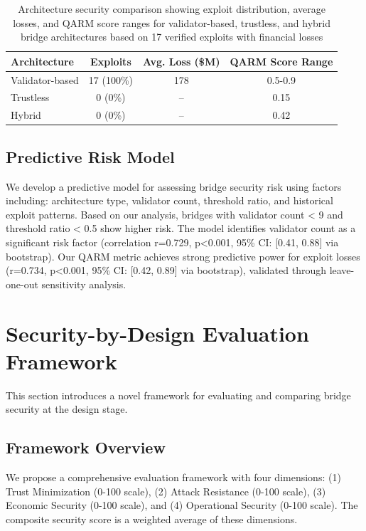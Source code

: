 \documentclass[runningheads]{llncs}
\begin{document}
\begin{table}[!ht]
    \centering
    \caption{Architecture security comparison showing exploit distribution, average losses, and QARM score ranges for validator-based, trustless, and hybrid bridge architectures based on 17 verified exploits with financial losses}
    \label{tab:architecture_security}
    \begin{tabular}{lccc}
        \toprule
        \textbf{Architecture} & \textbf{Exploits} & \textbf{Avg. Loss (\$M)} & \textbf{QARM Score Range} \\
        \midrule
        Validator-based & 17 (100\%) & 178 & 0.5-0.9 \\
        Trustless & 0 (0\%) & -- & 0.15 \\
        Hybrid & 0 (0\%) & -- & 0.42 \\
        \bottomrule
    \end{tabular}
\end{table}

\subsection{Predictive Risk Model}
We develop a predictive model for assessing bridge security risk using factors including: architecture type, validator count, threshold ratio, and historical exploit patterns. Based on our analysis, bridges with validator count < 9 and threshold ratio < 0.5 show higher risk. The model identifies validator count as a significant risk factor (correlation r=0.729, p<0.001, 95\% CI: [0.41, 0.88] via bootstrap). Our QARM metric achieves strong predictive power for exploit losses (r=0.734, p<0.001, 95\% CI: [0.42, 0.89] via bootstrap), validated through leave-one-out sensitivity analysis.

\vspace{-0.3cm}
\section{Security-by-Design Evaluation Framework}
\label{sec:framework}

This section introduces a novel framework for evaluating and comparing bridge security at the design stage.

\subsection{Framework Overview}
We propose a comprehensive evaluation framework with four dimensions: (1) Trust Minimization (0-100 scale), (2) Attack Resistance (0-100 scale), (3) Economic Security (0-100 scale), and (4) Operational Security (0-100 scale). The composite security score is a weighted average of these dimensions.
\end{document}
